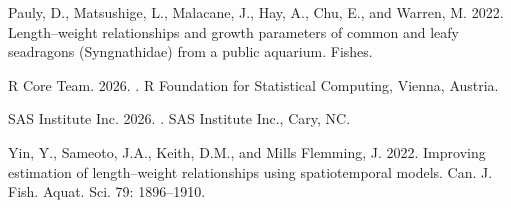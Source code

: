 \documentclass[12pt]{article}\usepackage[]{graphicx}\usepackage[]{color}
\begin{document}
\begin{CSLReferences}{1}{0}
Pauly, D., Matsushige, L., Malacane, J., Hay, A., Chu, E., and Warren, M. 2022. Length--weight relationships and growth parameters of common and leafy seadragons ({S}yngnathidae) from a public aquarium. Fishes.

R Core Team. 2026. . R Foundation for Statistical Computing, Vienna, Austria.

SAS Institute Inc. 2026. . SAS Institute Inc., Cary, NC.

Yin, Y., Sameoto, J.A., Keith, D.M., and Mills Flemming, J. 2022. Improving estimation of length--weight relationships using spatiotemporal models. Can. J. Fish. Aquat. Sci. 79: 1896--1910.

\end{CSLReferences}
\end{document}
